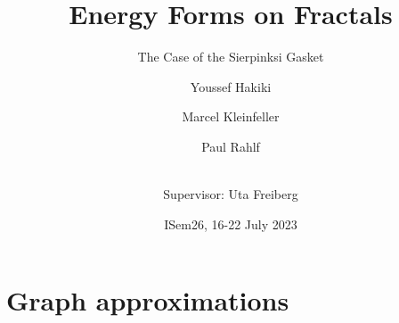 \documentclass[notheorems]{beamer}
\title{Energy Forms on Fractals}
\subtitle{The Case of the Sierpinksi Gasket}
\author %
{Youssef Hakiki\inst{1} \and Marcel Kleinfeller\inst{2} \and Paul Rahlf\inst{3} \and \\[3mm] {\small Supervisor: Uta Freiberg\inst{4}}}
\institute[VFU] %
{
  \inst{1}%
  Cadi Ayyad University
  \and
  \inst{2}%
  Technical University of Darmstadt
  \and
  \inst{3}%
  Kiel University
  \and
  \inst{4}%
  Chemnitz University of Technology
}
\date %
{ISem26, 16-22 July 2023}
\theoremstyle{definition}
\theoremstyle{plain}
\theoremstyle{remark}
\newcommand{\1}{\mathds{1}} %
\begin{document}
\begin{frame}
    \titlepage
\end{frame}


\section{Graph approximations}



\end{document}
